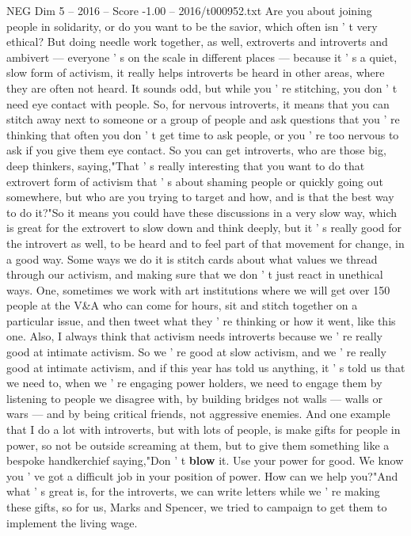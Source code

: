 \begin{textsample}{NEG Dim 5 – 2016 – Score -1.00 – 2016/t000952.txt}
Are you about joining people in solidarity, or do you want to be the savior, which often isn ' t very ethical?
But doing needle work together, as well, extroverts and introverts and ambivert — everyone ' s on the scale in different places — because it ' s a quiet, slow form of activism, it really helps introverts be heard in other areas, where they are often not heard.
It sounds odd, but while you ' re stitching, you don ' t need eye contact with people.
So, for nervous introverts, it means that you can stitch away next to someone or a group of people and ask questions that you ' re thinking that often you don ' t get time to ask people, or you ' re too nervous to ask if you give them eye contact.
So you can get introverts, who are those big, deep thinkers, saying,"That ' s really interesting that you want to do that extrovert form of activism that ' s about shaming people or quickly going out somewhere, but who are you trying to target and how, and is that the best way to do it?"So it means you could have these discussions in a very slow way, which is great for the extrovert to slow down and think deeply, but it ' s really good for the introvert as well, to be heard and to feel part of that movement for change, in a good way.
Some ways we do it is stitch cards about what values we thread through our activism, and making sure that we don ' t just react in unethical ways.
One, sometimes we work with art institutions where we will get over 150 people at the V\&A who can come for hours, sit and stitch together on a particular issue, and then tweet what they ' re thinking or how it went, like this one.
Also, I always think that activism needs introverts because we ' re really good at intimate activism.
So we ' re good at slow activism, and we ' re really good at intimate activism, and if this year has told us anything, it ' s told us that we need to, when we ' re engaging power holders, we need to engage them by listening to people we disagree with, by building bridges not walls — walls or wars — and by being critical friends, not aggressive enemies.
And one example that I do a lot with introverts, but with lots of people, is make gifts for people in power, so not be outside screaming at them, but to give them something like a bespoke handkerchief saying,"Don ' t \textbf{blow} it.
Use your power for good.
We know you ' ve got a difficult job in your position of power.
How can we help you?"And what ' s great is, for the introverts, we can write letters while we ' re making these gifts, so for us, Marks and Spencer, we tried to campaign to get them to implement the living wage.

\end{textsample}
